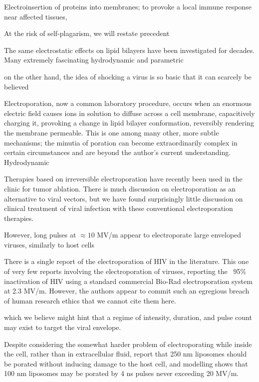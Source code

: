 \documentclass[fleqn,10pt]{paper}
\begin{document}
Electroinsertion of proteins into membranes\cite{Clinical1996}; to provoke a local immune response near affected tissues,  

At the risk of self-plagarism, we will restate precedent 

The same electrostatic effects on lipid bilayers have been investigated for decades. Many extremely fascinating hydrodynamic and parametric 



on the other hand, the idea of shocking a virus is so basic that it can scarcely be believed 


Electroporation\cite{Electroporation1988}, now a common laboratory procedure, occurs when an enormous electric field causes ions in solution to diffuse across a cell membrane, capacitively charging it, provoking a change in lipid bilayer conformation\cite{Membrane2016}, reversibly rendering the membrane permeable. This is one among many other, more subtle mechanisms; the minutia of poration can become extraordinarily complex in certain circumstances and are beyond the author's current understanding\cite{Theoretical2007}. Hydrodynamic

Therapies based on irreversible electroporation\cite{Nonthermal2013}\cite{Lipid2017} have recently been used in the clinic\cite{Irreversible2013} for tumor ablation. There is much discussion on electroporation as an alternative to viral vectors, but we have found surprisingly little discussion on clinical treatment of viral infection with these conventional electroporation therapies.

However, long pulses at $\approx10$ MV/m appear to electroporate large enveloped viruses, similarly to host cells\cite{AC2017}

There is a single report of the electroporation of HIV in the literature. This one of very few reports involving the electroporation of viruses, reporting the ~95\% inactivation of HIV  using a standard commercial Bio-Rad electroporation system at 2.3 MV/m. However, the authors appear to commit such an egregious breach of human research ethics that we cannot cite them here.

 which we believe might hint that a regime of intensity, duration, and pulse count may exist to target the viral envelope. 
 
Despite considering the somewhat harder problem of electroporating while inside the cell, rather than in extracellular fluid, \cite{Electroporation2013} report that 250 nm liposomes should be porated without inducing damage to the host cell, and modelling shows that 100 nm liposomes may be porated by 4 ns pulses never exceeding 20 MV/m. 
\end{document}

